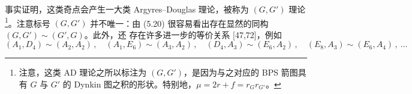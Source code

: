 
事实证明，这类奇点会产生一大类 Argyres--Douglas 理论，被称为 $(G,G')$ 理论\footnote{注意，这类 AD 理论之所以标注为 $(G,G')$，是因为与之对应的 BPS 箭图具有 $G$ 与 $G'$ 的 Dynkin 图之积的形状。特别地，$\mu=2r+f=r_Gr_{G'}$。}。注意标号 $(G,G')$ 并不唯一：由 (5.20) 很容易看出存在显然的同构 $(G,G')\sim(G',G)$。此外，还
存在许多进一步的等价关系 [47,72]，例如
\begin{equation}
  (A_1,D_4)\sim(A_2,A_2)\,,\quad (A_1,E_6)\sim(A_3,A_2)\,,\quad (D_4,A_3)\sim(E_6,A_2)\,,\quad (E_8,A_3)\sim(E_6,A_4)\,,\ \dots
  \tag{5.22}
\end{equation}


